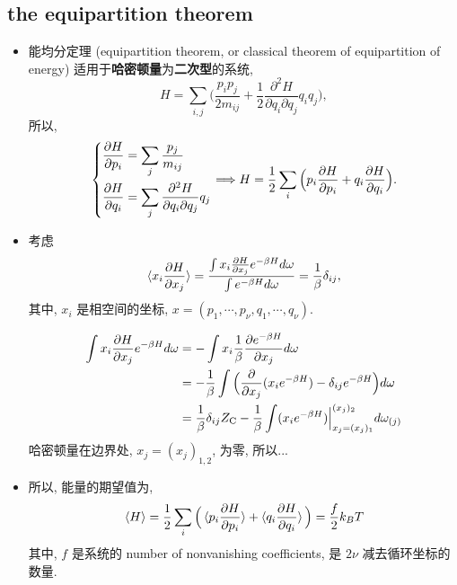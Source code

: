 \subsection{the equipartition theorem}
\begin{itemize}
	\item 能均分定理 (equipartition theorem, or classical theorem of equipartition of energy) 适用于\textbf{哈密顿量}为\textbf{二次型}的系统,
	\begin{equation}
		H = \sum_{i, j} \Big( \frac{p_i p_j}{2 m_{i j}} + \frac{1}{2} \frac{\partial^2 H}{\partial q_i \partial q_j} q_i q_j \Big),
	\end{equation}
	所以,
	\begin{equation}
		\begin{dcases}
			\frac{\partial H}{\partial p_i} = \sum_j \frac{p_j}{m_{i j}} \\
			\frac{\partial H}{\partial q_i} = \sum_j \frac{\partial^2 H}{\partial q_i \partial q_j} q_j
		\end{dcases} \Longrightarrow H = \frac{1}{2} \sum_i \Big( p_i \frac{\partial H}{\partial p_i} + q_i \frac{\partial H}{\partial q_i} \Big).
	\end{equation}
	
	\item 考虑
	\begin{equation}
		\braket{x_i \frac{\partial H}{\partial x_j}} = \frac{\int x_i \frac{\partial H}{\partial x_j} e^{- \beta H} d\omega}{\int e^{- \beta H} d\omega} = \frac{1}{\beta} \delta_{i j},
	\end{equation}
	其中, $x_i$ 是相空间的坐标, $x = (p_1, \cdots, p_\nu, q_1, \cdots, q_\nu)$.
	
	\begin{tcolorbox}[title=proof:]
		\begin{align}
			\int x_i \frac{\partial H}{\partial x_j} e^{- \beta H} d\omega &= - \int x_i \frac{1}{\beta} \frac{\partial e^{- \beta H}}{\partial x_j} d\omega \notag \\
			&= - \frac{1}{\beta} \int \Big( \frac{\partial}{\partial x_j} (x_i e^{- \beta H}) - \delta_{i j} e^{- \beta H} \Big) d\omega \notag \\
			&= \frac{1}{\beta} \delta_{i j} Z_\text{C} - \frac{1}{\beta} \int (x_i e^{- \beta H}) \Big|_{x_j = (x_j)_1}^{(x_j)_2} d\omega_{(j)}
		\end{align}
		哈密顿量在边界处, $x_j = (x_j)_{1, 2}$, 为零, 所以...
	\end{tcolorbox}
	
	\item 所以, 能量的期望值为,
	\begin{equation}
		\braket{H} = \frac{1}{2} \sum_i \Big( \braket{p_i \frac{\partial H}{\partial p_i}} + \braket{q_i \frac{\partial H}{\partial q_i}} \Big) = \frac{f}{2} k_B T
	\end{equation}
	其中, $f$ 是系统的 number of nonvanishing coefficients, 是 $2 \nu$ 减去循环坐标的数量.
	

\end{itemize}
